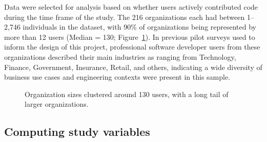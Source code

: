 \documentclass[
]{article}
\begin{document}
Data were selected for analysis based on whether users actively
contributed code during the time frame of the study. The 216
organizations each had between 1--2,746 individuals in the dataset, with
90\% of organizations being represented by more than 12 users (Median =
130; Figure~\ref{fig-org-size}). In previous pilot surveys used to
inform the design of this project, professional software developer users
from these organizations described their main industries as ranging from
Technology, Finance, Government, Insurance, Retail, and others,
indicating a wide diversity of business use cases and engineering
contexts were present in this sample.

\begin{figure}[htbp]


\caption[Histogram of organization sizes in the
dataset.]{\label{fig-org-size}Organization sizes clustered around 130
users, with a long tail of larger organizations.}

\end{figure}%

\subsection{Computing study variables}\label{computing-study-variables}
\end{document}
